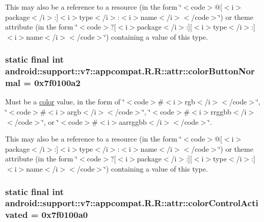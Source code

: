 This may also be a reference to a resource (in the form \char`\"{}$<$code$>$@\mbox{[}$<$i$>$package$<$/i$>$:\mbox{]}$<$i$>$type$<$/i$>$:$<$i$>$name$<$/i$>$$<$/code$>$\char`\"{}) or theme attribute (in the form \char`\"{}$<$code$>$?\mbox{[}$<$i$>$package$<$/i$>$:\mbox{]}\mbox{[}$<$i$>$type$<$/i$>$:\mbox{]}$<$i$>$name$<$/i$>$$<$/code$>$\char`\"{}) containing a value of this type. \hypertarget{classandroid_1_1support_1_1v7_1_1appcompat_1_1_r_1_1attr_9a5be52dd1a8fef91814d62ef4c75105}{
\subsubsection[{colorButtonNormal}]{\setlength{\rightskip}{0pt plus 5cm}static final int android::support::v7::appcompat.R.R::attr::colorButtonNormal = 0x7f0100a2}}
\label{classandroid_1_1support_1_1v7_1_1appcompat_1_1_r_1_1attr_9a5be52dd1a8fef91814d62ef4c75105}


Must be a \hyperlink{classandroid_1_1support_1_1v7_1_1appcompat_1_1_r_1_1color}{color} value, in the form of \char`\"{}$<$code$>$\#$<$i$>$rgb$<$/i$>$$<$/code$>$\char`\"{}, \char`\"{}$<$code$>$\#$<$i$>$argb$<$/i$>$$<$/code$>$\char`\"{}, \char`\"{}$<$code$>$\#$<$i$>$rrggbb$<$/i$>$$<$/code$>$\char`\"{}, or \char`\"{}$<$code$>$\#$<$i$>$aarrggbb$<$/i$>$$<$/code$>$\char`\"{}. 

This may also be a reference to a resource (in the form \char`\"{}$<$code$>$@\mbox{[}$<$i$>$package$<$/i$>$:\mbox{]}$<$i$>$type$<$/i$>$:$<$i$>$name$<$/i$>$$<$/code$>$\char`\"{}) or theme attribute (in the form \char`\"{}$<$code$>$?\mbox{[}$<$i$>$package$<$/i$>$:\mbox{]}\mbox{[}$<$i$>$type$<$/i$>$:\mbox{]}$<$i$>$name$<$/i$>$$<$/code$>$\char`\"{}) containing a value of this type. \hypertarget{classandroid_1_1support_1_1v7_1_1appcompat_1_1_r_1_1attr_b59f72d5bf38093795bd5857e81f8202}{
\subsubsection[{colorControlActivated}]{\setlength{\rightskip}{0pt plus 5cm}static final int android::support::v7::appcompat.R.R::attr::colorControlActivated = 0x7f0100a0}}
\label{classandroid_1_1support_1_1v7_1_1appcompat_1_1_r_1_1attr_b59f72d5bf38093795bd5857e81f8202}


